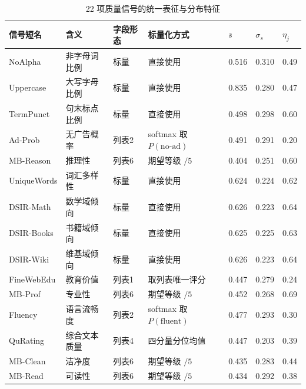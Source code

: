 \documentclass[bwprint]{gmcmthesis}
\begin{document}
\begin{table}[htbp]
    \centering
    \caption{22 项质量信号的统一表征与分布特征}
    \label{tab:q1_indicator}
    \scriptsize
    \setlength{\tabcolsep}{4pt}
    \renewcommand{\arraystretch}{1.06}
    \begin{tabular}{@{}C{1.80cm} C{2.10cm} C{1.35cm} C{2.55cm} C{1.10cm} C{1.20cm} C{1.20cm}@{}}
        \toprule
        信号短名 & 含义 & 字段形态 & 标量化方式 & $\bar{s}$ & $\sigma_{s}$ & $\eta_j$ \\
        \midrule
        NoAlpha      & 非字母词比例   & 标量   & 直接使用                     & 0.516 & 0.310 & 0.49 \\
        Uppercase    & 大写字母比例   & 标量   & 直接使用                     & 0.835 & 0.280 & 0.47 \\
        TermPunct    & 句末标点比例   & 标量   & 直接使用                     & 0.498 & 0.298 & 0.60 \\
        Ad-Prob      & 无广告概率     & 列表2  & softmax 取 $P(\mathrm{no\text{-}ad})$ & 0.491 & 0.291 & 0.20 \\
        MB-Reason    & 推理性         & 列表6  & 期望等级 $/5$                & 0.404 & 0.251 & 0.60 \\
        UniqueWords  & 词汇多样性     & 标量    & 直接使用                     & 0.624 & 0.224 & 0.62 \\
        DSIR-Math    & 数学域倾向     & 标量    & 直接使用                     & 0.626 & 0.223 & 0.64 \\
        DSIR-Books   & 书籍域倾向     & 标量    & 直接使用                     & 0.625 & 0.225 & 0.63 \\
        DSIR-Wiki    & 维基域倾向     & 标量    & 直接使用                     & 0.626 & 0.223 & 0.64 \\
        FineWebEdu   & 教育价值       & 列表1  & 取列表唯一评分               & 0.447 & 0.279 & 0.24 \\
        MB-Prof      & 专业性         & 列表6  & 期望等级 $/5$                & 0.452 & 0.268 & 0.69 \\
        Fluency      & 语言流畅度     & 列表2  & softmax 取 $P(\mathrm{fluent})$ & 0.477 & 0.293 & 0.30 \\
        QuRating     & 综合文本质量   & 列表4  & 四分量分位均值               & 0.447 & 0.203 & 0.39 \\
        MB-Clean     & 洁净度         & 列表6  & 期望等级 $/5$                & 0.435 & 0.283 & 0.44 \\
        MB-Read      & 可读性         & 列表6  & 期望等级 $/5$                & 0.434 & 0.292 & 0.38 \\

\end{tabular}
\end{table}
\end{document}
